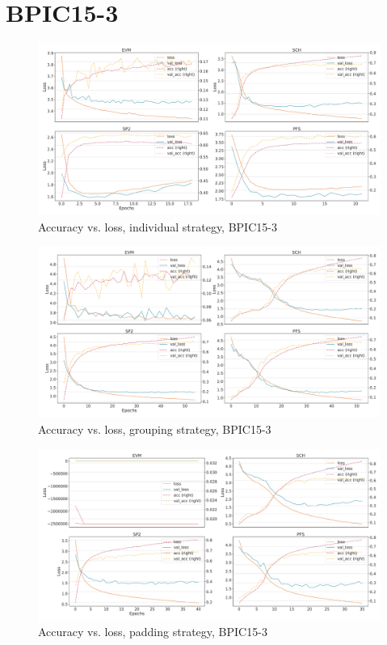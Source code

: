 \section*{BPIC15-3}
\begin{figure}[!htb]
    \centering
    \includegraphics[width=\textwidth]{gfx/bpic2015_3/individual_loss_acc_curve.pdf}
    \caption{Accuracy vs. loss, individual strategy, BPIC15-3}
\end{figure}
\begin{figure}[!htb]
    \centering
    \includegraphics[width=\textwidth]{gfx/bpic2015_3/grouped_loss_acc_curve.pdf}
    \caption{Accuracy vs. loss, grouping strategy, BPIC15-3}
\end{figure}
\begin{figure}[!htb]
    \centering
    \includegraphics[width=\textwidth]{gfx/bpic2015_3/padded_loss_acc_curve.pdf}
    \caption{Accuracy vs. loss, padding strategy, BPIC15-3}
\end{figure}
